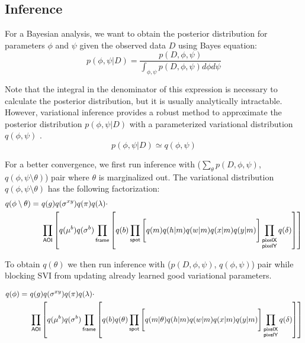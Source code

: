 \subsection*{Inference}

For a Bayesian analysis, we want to obtain the posterior distribution for parameters $\phi$ and $\psi$ given the observed data $D$ using Bayes equation:
%
\begin{equation}
    p(\phi, \psi | D) =
    \dfrac{p(D, \phi, \psi)}{\int_{\phi, \psi} p(D, \phi, \psi) d\phi d\psi}
\end{equation}

Note that the integral in the denominator of this expression is necessary to calculate the posterior distribution, but it is usually analytically intractable. However, variational inference provides a robust method to approximate the posterior distribution $p(\phi, \psi | D)$ with a parameterized variational distribution $q(\phi, \psi)$ \cite{Bishop2006-oa}.
%
\begin{equation}
    p(\phi, \psi | D) \simeq q(\phi, \psi)
\end{equation}

For a better convergence, we first run inference with ($\sum_\theta p(D, \phi, \psi)$, $q(\phi, \psi \setminus \theta)$) pair where $\theta$ is marginalized out. The variational distribution $q(\phi, \psi \setminus \theta)$ has the following factorization:
%
\begin{equation}
\begin{aligned}
    q(\phi \setminus \theta) =~&q(g) q(\sigma^{xy}) q(\pi) q(\lambda) \cdot \\
    &\prod_{\mathsf{AOI}} \left[ q(\mu^b) q(\sigma^b) \prod_{\mathsf{frame}} \left[ \vphantom{\prod_{F}} q(b) \prod_{\mathsf{spot}} \left[ \vphantom{\prod_{F}} q(m) q(h | m) q(w | m) q(x | m) q(y | m) \right] \prod_{\substack{\mathsf{pixelX} \\ \mathsf{pixelY}}} q(\delta) \right] \right]
\end{aligned}
\end{equation}

To obtain $q(\theta)$ we then run inference with ($p(D, \phi, \psi)$, $q(\phi, \psi)$) pair while blocking SVI from updating already learned good variational parameters.

\begin{equation}
\begin{aligned}
    q(\phi) =~&q(g) q(\sigma^{xy}) q(\pi) q(\lambda) \cdot \\
    &\prod_{\mathsf{AOI}} \left[ q(\mu^b) q(\sigma^b) \prod_{\mathsf{frame}} \left[ q(b) q(\theta) \prod_{\mathsf{spot}} \left[ \vphantom{\prod_{F}} q(m | \theta) q(h | m) q(w | m) q(x | m) q(y | m) \right] \prod_{\substack{\mathsf{pixelX} \\ \mathsf{pixelY}}} q(\delta) \right] \right]
\end{aligned}
\end{equation}

